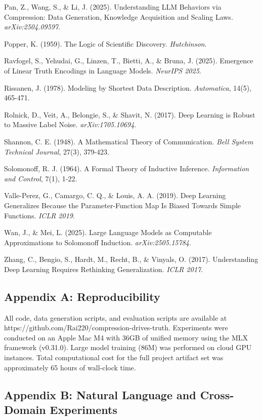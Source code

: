\documentclass[
  11pt,
]{article}
\begin{document}
Pan, Z., Wang, S., \& Li, J. (2025). Understanding LLM Behaviors via
Compression: Data Generation, Knowledge Acquisition and Scaling Laws.
\emph{arXiv:2504.09597}.

Popper, K. (1959). The Logic of Scientific Discovery. \emph{Hutchinson}.

Ravfogel, S., Yehudai, G., Linzen, T., Bietti, A., \& Bruna, J. (2025).
Emergence of Linear Truth Encodings in Language Models. \emph{NeurIPS
2025}.

Rissanen, J. (1978). Modeling by Shortest Data Description.
\emph{Automatica}, 14(5), 465-471.

Rolnick, D., Veit, A., Belongie, S., \& Shavit, N. (2017). Deep Learning
is Robust to Massive Label Noise. \emph{arXiv:1705.10694}.

Shannon, C. E. (1948). A Mathematical Theory of Communication.
\emph{Bell System Technical Journal}, 27(3), 379-423.

Solomonoff, R. J. (1964). A Formal Theory of Inductive Inference.
\emph{Information and Control}, 7(1), 1-22.

Valle-Perez, G., Camargo, C. Q., \& Louis, A. A. (2019). Deep Learning
Generalizes Because the Parameter-Function Map Is Biased Towards Simple
Functions. \emph{ICLR 2019}.

Wan, J., \& Mei, L. (2025). Large Language Models as Computable
Approximations to Solomonoff Induction. \emph{arXiv:2505.15784}.

Zhang, C., Bengio, S., Hardt, M., Recht, B., \& Vinyals, O. (2017).
Understanding Deep Learning Requires Rethinking Generalization.
\emph{ICLR 2017}.

\subsection{Appendix A:
Reproducibility}\label{appendix-a-reproducibility}

All code, data generation scripts, and evaluation scripts are available
at https://github.com/Rai220/compression-drives-truth. Experiments were
conducted on an Apple Mac M4 with 36GB of unified memory using the MLX
framework (v0.31.0). Large model training (86M) was performed on cloud
GPU instances. Total computational cost for the full project artifact
set was approximately 65 hours of wall-clock time.

\subsection{Appendix B: Natural Language and Cross-Domain
Experiments}\label{appendix-b-natural-language-and-cross-domain-experiments}
\end{document}
